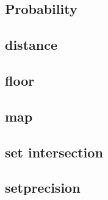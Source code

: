     \subsection{Probability}
            
    \subsection{distance}
            
    \subsection{floor}
            
    \subsection{map}
            
    \subsection{set intersection}
            
    \subsection{setprecision}
            